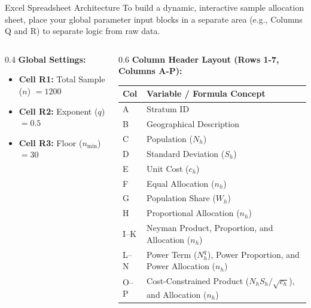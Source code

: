 \documentclass[10pt, aspectratio=169]{beamer}
\begin{document}
  \begin{frame}{Excel Spreadsheet Architecture}
      To build a dynamic, interactive sample allocation sheet, place your global parameter input blocks in a separate area (e.g., Columns Q and R) to separate logic from raw data.
      
      \begin{columns}
          \begin{column}{0.4\textwidth}
              \textbf{Global Settings:}
              \begin{itemize}
                  \item \textbf{Cell R1:} Total Sample ($n$) $= 1200$
                  \item \textbf{Cell R2:} Exponent ($q$) $= 0.5$
                  \item \textbf{Cell R3:} Floor ($n_{\min}$) $= 30$
              \end{itemize}
          \end{column}
          \begin{column}{0.6\textwidth}
              \textbf{Column Header Layout (Rows 1-7, Columns A-P):}
              \begin{table}
                  \tiny
                  \begin{tabularx}{\textwidth}{ll}
                      \toprule
                      \textbf{Col} & \textbf{Variable / Formula Concept} \\
                      \midrule
                      A & Stratum ID \\
                      B & Geographical Description \\
                      C & Population ($N_h$) \\
                      D & Standard Deviation ($S_h$) \\
                      E & Unit Cost ($c_h$) \\
                      F & Equal Allocation ($n_h$) \\
                      G & Population Share ($W_h$) \\
                      H & Proportional Allocation ($n_h$) \\
                      I--K & Neyman Product, Proportion, and Allocation ($n_h$) \\
                      L--N & Power Term ($N_h^q$), Power Proportion, and Power Allocation ($n_h$) \\
                      O--P & Cost-Constrained Product ($N_h S_h / \sqrt{c_h}$), and Allocation ($n_h$) \\
                      \bottomrule
                  \end{tabularx}
              \end{table}
          \end{column}
      \end{columns}
  \end{frame}
  
\end{document}
